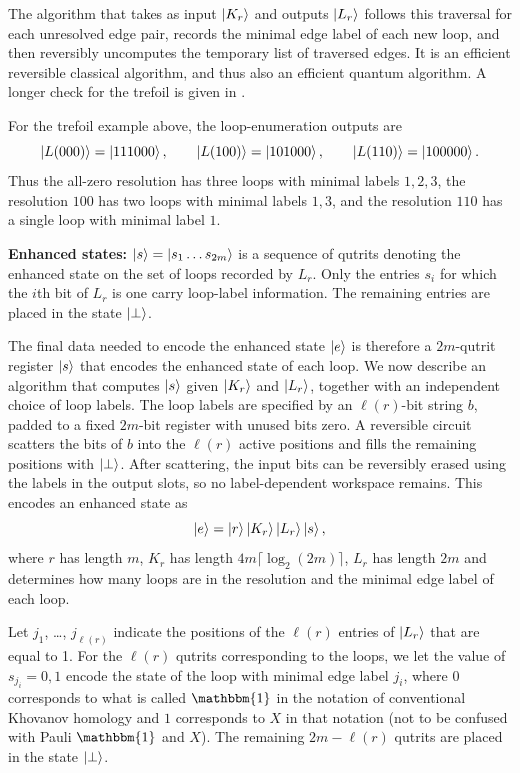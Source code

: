 \documentclass[a4paper,onecolumn,unpublished]{quantumarticle}
\theoremstyle{plain}
\theoremstyle{definition}
\theoremstyle{definition}
\numberwithin{equation}{section}
\def\1{\mathbbm{1}}%
\begin{document}
The algorithm that takes as input $\ket{K_r}$ and outputs $\ket{L_r}$ follows this traversal for each unresolved edge pair, records the minimal edge label of each new loop, and then reversibly uncomputes the temporary list of traversed edges.  It is an efficient reversible classical algorithm, and thus also an efficient quantum algorithm.  A longer check for the trefoil is given in .

For the trefoil example above, the loop-enumeration outputs are
\begin{equation}\label{eq:trefoil_loop_registers}
    \ket{L(000)}=\ket{111000},\qquad
    \ket{L(100)}=\ket{101000},\qquad
    \ket{L(110)}=\ket{100000}.
\end{equation}
Thus the all-zero resolution has three loops with minimal labels $1,2,3$, the resolution $100$ has two loops with minimal labels $1,3$, and the resolution $110$ has a single loop with minimal label $1$.

\smallskip
\noindent \textbf{Enhanced states:} $\ket{s}=\ket{s_1\dots s_{2m}}$ is a sequence of qutrits denoting the enhanced state on the set of loops recorded by $L_r$. Only the entries $s_i$ for which the $i$th bit of $L_r$ is one carry loop-label information.  The remaining entries are placed in the state $\ket{\perp}$.

The final data needed to encode the enhanced state $\ket{e}$ is therefore a $2m$-qutrit register $\ket{s}$ that encodes the enhanced state of each loop. We now describe an algorithm that computes $\ket{s}$ given $\ket{K_r}$ and $\ket{L_r}$, together with an independent choice of loop labels. The loop labels are specified by an $\ell(r)$-bit string $b$, padded to a fixed $2m$-bit register with unused bits zero. A reversible circuit scatters the bits of $b$ into the $\ell(r)$ active positions and fills the remaining positions with $\ket{\perp}$. After scattering, the input bits can be reversibly erased using the labels in the output slots, so no label-dependent workspace remains. This encodes an enhanced state as
\begin{equation}
    \ket{e} = \ket{r}\ket{K_r}\ket{L_r}\ket{s},
\end{equation} where $r$ has length $m$, $K_r$ has length $4m\lceil\log_2(2m)\rceil$, $L_r$ has length $2m$  and determines how many loops are in the resolution and the minimal edge label of each loop. 

Let $j_1$, \dots, $j_{\ell(r)}$ indicate the positions of the $\ell(r)$ entries of $\ket{L_r}$ that are equal to 1. For the $\ell(r)$ qutrits corresponding to the loops, we let the value of $s_{j_i} = 0,1$ encode the state of the loop with minimal edge label $j_i$, where $0$ corresponds to what is called $\1$ in the notation of conventional Khovanov homology and $1$ corresponds to $X$ in that notation (not to be confused with Pauli $\1$ and $X$). The remaining $2m - \ell(r)$ qutrits are placed in the state $\ket{\perp}$.
 
\end{document}
